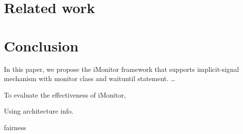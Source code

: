 \documentclass[preprint]{sigplanconf}
\begin{document}



\section{Related work} \label{sec:related}
\section{Conclusion} \label{sec:conclu}
In this paper, we propose the iMonitor framework that supports implicit-signal
mechanism with monitor class and waituntil statement. \dots

To evaluate the effectiveness of iMonitor, 

Using architecture info.

fairness

\end{document}
